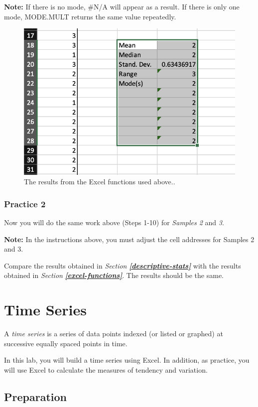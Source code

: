 \documentclass[
]{book}
\begin{document}
\textbf{Note:} If there is no mode, \#N/A will appear as a result. If there is only one mode, MODE.MULT returns the same value repeatedly.

\begin{figure}

{\centering \includegraphics[width=0.6\linewidth]{images/excel-functions} 

}

\caption{The results from the Excel functions used above..}\label{fig:excel-functions}
\end{figure}

\hypertarget{practice-2-2}{%
\subsection{Practice 2}\label{practice-2-2}}

Now you will do the same work above (Steps 1-10) for \emph{Samples 2} and \emph{3}.

\textbf{Note:} In the instructions above, you must adjust the cell addresses for Samples 2 and 3.

Compare the results obtained in \emph{Section} \textbf{\emph{\ref{descriptive-stats}}} with the results obtained in \emph{Section} \textbf{\emph{\ref{excel-functions}}}. The results should be the same.

\hypertarget{time-series}{%
\chapter{Time Series}\label{time-series}}

A \emph{time series} is a series of data points indexed (or listed or graphed) at successive equally spaced points in time.

In this lab, you will build a time series using Excel. In addition, as practice, you will use Excel to calculate the measures of tendency and variation.

\hypertarget{preparation-2}{%
\section{Preparation}\label{preparation-2}}
\end{document}
